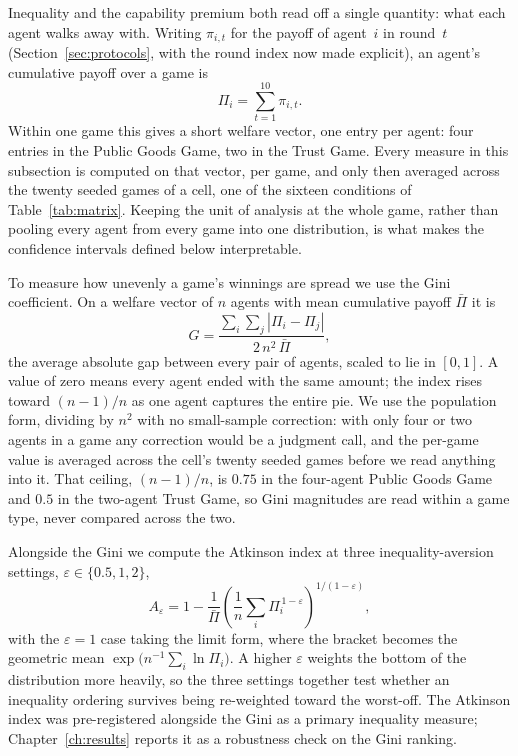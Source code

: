 Inequality and the capability premium both read off a single quantity: what each
agent walks away with. Writing $\pi_{i,t}$ for the payoff of agent~$i$ in
round~$t$ (Section~\ref{sec:protocols}, with the round index now made explicit),
an agent's cumulative payoff over a game is
\[
  \Pi_i = \sum_{t=1}^{10} \pi_{i,t}.
\]
Within one game this gives a short welfare vector, one entry per agent: four
entries in the Public Goods Game, two in the Trust Game. Every measure in this
subsection is computed on that vector, per game, and only then averaged across
the twenty seeded games of a cell, one of the sixteen conditions of
Table~\ref{tab:matrix}. Keeping the unit of analysis at the whole
game, rather than pooling every agent from every game into one distribution, is
what makes the confidence intervals defined below interpretable.

To measure how unevenly a game's winnings are spread we use the Gini
coefficient. On a welfare vector of $n$ agents with mean cumulative payoff
$\bar{\Pi}$ it is
\[
  G = \frac{\sum_{i}\sum_{j} |\Pi_i - \Pi_j|}{2\,n^2\,\bar{\Pi}},
\]
the average absolute gap between every pair of agents, scaled to lie in $[0,1]$.
A value of zero means every agent ended with the same amount; the index rises
toward $(n-1)/n$ as one agent captures the entire pie. We use the population form,
dividing by $n^2$ with no small-sample correction: with only four or two agents
in a game any correction would be a judgment call, and the per-game value is
averaged across the cell's twenty seeded games before we read anything into it.
That ceiling, $(n-1)/n$, is $0.75$ in the four-agent Public Goods Game and $0.5$
in the two-agent Trust Game, so Gini magnitudes are read within a game type,
never compared across the two.

Alongside the Gini we compute the Atkinson index at three inequality-aversion
settings, $\varepsilon \in \{0.5, 1, 2\}$,
\[
  A_\varepsilon = 1 - \frac{1}{\bar{\Pi}}
  \left( \frac{1}{n}\sum_{i} \Pi_i^{\,1-\varepsilon} \right)^{1/(1-\varepsilon)},
\]
with the $\varepsilon = 1$ case taking the limit form, where the bracket becomes
the geometric mean $\exp\big(n^{-1}\sum_i \ln \Pi_i\big)$. A higher $\varepsilon$
weights the bottom of the distribution more heavily, so the three settings
together test whether an inequality ordering survives being re-weighted toward the
worst-off. The Atkinson index was pre-registered alongside the Gini as a primary
inequality measure; Chapter~\ref{ch:results} reports it as a robustness check on
the Gini ranking.

